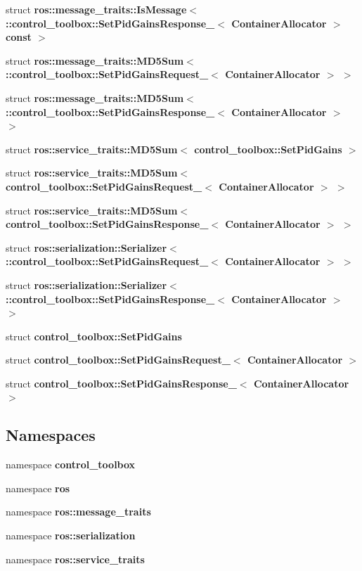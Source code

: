 \begin{DoxyCompactItemize}
\item 
struct {\bf ros\-::message\-\_\-traits\-::\-Is\-Message$<$ \-::control\-\_\-toolbox\-::\-Set\-Pid\-Gains\-Response\-\_\-$<$ Container\-Allocator $>$const  $>$}
\item 
struct {\bf ros\-::message\-\_\-traits\-::\-M\-D5\-Sum$<$ \-::control\-\_\-toolbox\-::\-Set\-Pid\-Gains\-Request\-\_\-$<$ Container\-Allocator $>$ $>$}
\item 
struct {\bf ros\-::message\-\_\-traits\-::\-M\-D5\-Sum$<$ \-::control\-\_\-toolbox\-::\-Set\-Pid\-Gains\-Response\-\_\-$<$ Container\-Allocator $>$ $>$}
\item 
struct {\bf ros\-::service\-\_\-traits\-::\-M\-D5\-Sum$<$ control\-\_\-toolbox\-::\-Set\-Pid\-Gains $>$}
\item 
struct {\bf ros\-::service\-\_\-traits\-::\-M\-D5\-Sum$<$ control\-\_\-toolbox\-::\-Set\-Pid\-Gains\-Request\-\_\-$<$ Container\-Allocator $>$ $>$}
\item 
struct {\bf ros\-::service\-\_\-traits\-::\-M\-D5\-Sum$<$ control\-\_\-toolbox\-::\-Set\-Pid\-Gains\-Response\-\_\-$<$ Container\-Allocator $>$ $>$}
\item 
struct {\bf ros\-::serialization\-::\-Serializer$<$ \-::control\-\_\-toolbox\-::\-Set\-Pid\-Gains\-Request\-\_\-$<$ Container\-Allocator $>$ $>$}
\item 
struct {\bf ros\-::serialization\-::\-Serializer$<$ \-::control\-\_\-toolbox\-::\-Set\-Pid\-Gains\-Response\-\_\-$<$ Container\-Allocator $>$ $>$}
\item 
struct {\bf control\-\_\-toolbox\-::\-Set\-Pid\-Gains}
\item 
struct {\bf control\-\_\-toolbox\-::\-Set\-Pid\-Gains\-Request\-\_\-$<$ Container\-Allocator $>$}
\item 
struct {\bf control\-\_\-toolbox\-::\-Set\-Pid\-Gains\-Response\-\_\-$<$ Container\-Allocator $>$}
\end{DoxyCompactItemize}
\subsection*{\-Namespaces}
\begin{DoxyCompactItemize}
\item 
namespace {\bf control\-\_\-toolbox}
\item 
namespace {\bf ros}
\item 
namespace {\bf ros\-::message\-\_\-traits}
\item 
namespace {\bf ros\-::serialization}
\item 
namespace {\bf ros\-::service\-\_\-traits}
\end{DoxyCompactItemize}
